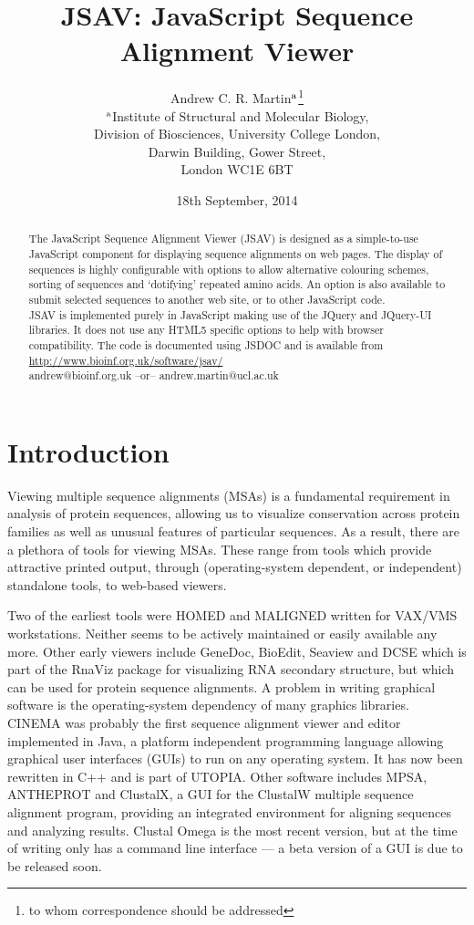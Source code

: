 \documentclass[a4]{article}
\title{JSAV: JavaScript Sequence Alignment Viewer}
\date{18th September, 2014}
\author{Andrew C. R. Martin\mbox{${}^{\rm a}$}\footnote{to whom
    correspondence should be addressed}\\
    \mbox{${}^{\rm a}$}Institute of Structural and Molecular Biology,\\
Division of Biosciences, University College London,\\
Darwin Building, Gower Street,\\
London WC1E 6BT}
\begin{document}
\maketitle

\begin{abstract}
 The JavaScript Sequence Alignment Viewer
(JSAV) is designed as a simple-to-use JavaScript component for
displaying sequence alignments on web pages.  The display of sequences
is highly configurable with options to allow alternative colouring
schemes, sorting of sequences and `dotifying' repeated amino acids. An
option is also available to submit selected sequences to another web
site, or to other JavaScript code.  \\
JSAV is implemented purely in JavaScript making use of the JQuery and
JQuery-UI libraries. It does not use any HTML5 specific options to help with
browser compatibility. The code is documented using JSDOC
and is available from \url{http://www.bioinf.org.uk/software/jsav/}\\
 andrew@bioinf.org.uk --or--
andrew.martin@ucl.ac.uk
\end{abstract}


\section{Introduction}
Viewing multiple sequence alignments (MSAs) is a fundamental
requirement in analysis of protein sequences, allowing us to visualize
conservation across protein families as well as unusual features of
particular sequences. As a result, there are a plethora of tools for
viewing MSAs. These range from tools which provide attractive printed
output, through (operating-system dependent, or independent)
standalone tools, to web-based viewers.

Two of the earliest tools were HOMED\cite{stockwell:homed} and
MALIGNED\cite{clark:maligned} written for VAX/VMS workstations.
Neither seems to be actively maintained or easily available any
more. Other early viewers include GeneDoc\cite{nicholas:genedoc},
BioEdit, Seaview\cite{galtier:seaview} and DCSE\cite{derijk:dcse}
which is part of the RnaViz package for visualizing RNA secondary
structure\cite{derijk:rnaviz}, but which can be used for protein
sequence alignments.  A problem in writing graphical software is the
operating-system dependency of many graphics libraries.
CINEMA\cite{parrysmith:cinema} was probably the first sequence
alignment viewer and editor implemented in Java, a platform
independent programming language allowing graphical user interfaces
(GUIs) to run on any operating system. It has now been rewritten in
C++ and is part of UTOPIA\cite{pettifer:utopia}. Other software
includes MPSA\cite{blanchet:mpsa}, ANTHEPROT\cite{deleage:antheprot}
and ClustalX\cite{thompson:clustalx}, a GUI for the ClustalW multiple
sequence alignment program, providing an integrated environment for
aligning sequences and analyzing results. Clustal Omega is the most
recent version, but at the time of writing only has a command line
interface --- a beta version of a GUI is due to be released soon.
\end{document}
